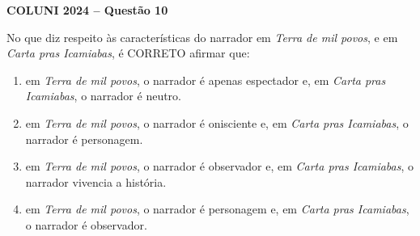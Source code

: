 \textbf{COLUNI 2024 -- Questão 10}\par\medskip No que diz respeito às características do narrador em \textit{Terra de mil povos}, e em \textit{Carta pras Icamiabas}, é CORRETO afirmar que:\begin{enumerate}
\item em \textit{Terra de mil povos}, o narrador é apenas espectador e, em \textit{Carta pras Icamiabas}, o narrador é neutro.
\item em \textit{Terra de mil povos}, o narrador é onisciente e, em \textit{Carta pras Icamiabas}, o narrador é personagem.
\item em \textit{Terra de mil povos}, o narrador é observador e, em \textit{Carta pras Icamiabas}, o narrador vivencia a história.
\item em \textit{Terra de mil povos}, o narrador é personagem e, em \textit{Carta pras Icamiabas}, o narrador é observador.

\end{enumerate}
